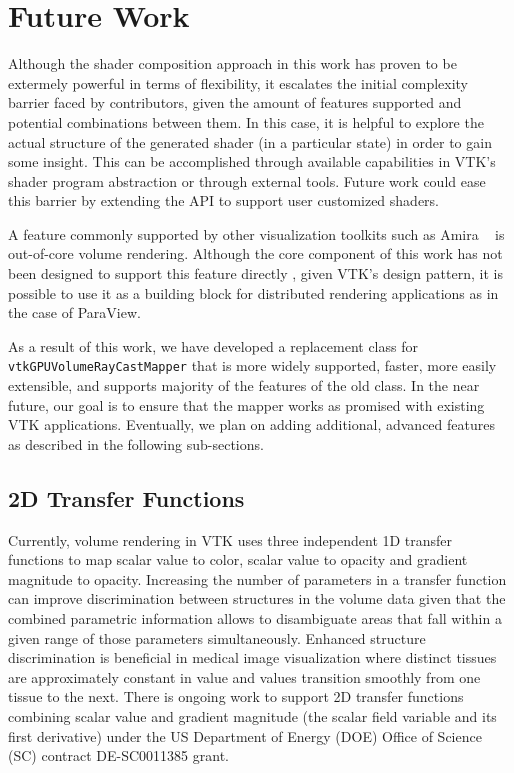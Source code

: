 \section{Future Work}
\label{future-work}

Although the shader composition approach in this work has proven to be extermely
powerful in terms of flexibility, it escalates the initial complexity barrier
faced by contributors, given the amount of features supported and potential
combinations between them.  In this case, it is helpful to explore the actual
structure of the generated shader (in a particular state) in order to gain some
insight. This can be accomplished through available capabilities in VTK's shader
program abstraction or through external tools. Future work could ease this
barrier by extending the API to support user customized shaders.

A feature commonly supported by other visualization toolkits such as Amira
~\citep{stalling2005amira} is out-of-core volume rendering. Although the core
component of this work has not been designed to support this feature directly
, given VTK's design pattern, it is possible to use it as a building block
for distributed rendering applications as in the case of ParaView.

As a result of this work, we have developed a replacement class for
\texttt{vtkGPUVolumeRayCastMapper} that is more widely supported, faster, more
easily extensible, and supports majority of the features of the old class. In
the near future, our goal is to ensure that the mapper works as promised with
existing VTK applications. Eventually, we plan on adding additional, advanced
features as described in the following sub-sections.

\subsection{2D Transfer Functions}
\label{2d-transfer-functions}
Currently, volume rendering in VTK uses three independent 1D transfer functions
to map scalar value to color, scalar value to opacity and gradient magnitude to
opacity. Increasing the number of parameters in a transfer function can improve
discrimination between structures in the volume data given that the combined
parametric information allows to disambiguate areas that fall within a given
range of those parameters simultaneously. Enhanced structure discrimination is
beneficial in medical image visualization where distinct tissues are
approximately constant in value and values transition smoothly from one tissue
to the next. There is ongoing work to support 2D transfer functions combining
scalar value and gradient magnitude (the scalar field variable and its first
derivative) under the US Department of Energy (DOE) Office of Science (SC)
contract DE-SC0011385 grant.

